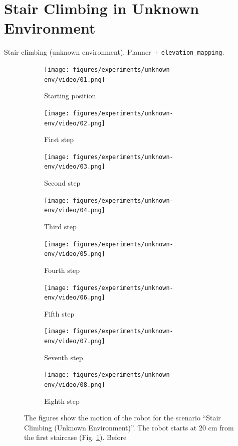 \section{Stair Climbing in Unknown Environment}
Stair climbing (unknown environment). Planner + \texttt{elevation\_mapping}.
\begin{figure}
  \begin{subfigure}{0.48\textwidth}
    \texttt{[image: figures/experiments/unknown-env/video/01.png]}
    \caption{Starting position}
    \label{fig:exp:unkenv:frame1}
  \end{subfigure}\hspace*{\fill}
  \begin{subfigure}{0.48\textwidth}
    \texttt{[image: figures/experiments/unknown-env/video/02.png]}
    \caption{First step}
    \label{fig:exp:unkenv:frame2}
  \end{subfigure}
  \begin{subfigure}{0.48\textwidth}
    \texttt{[image: figures/experiments/unknown-env/video/03.png]}
    \caption{Second step}
  \end{subfigure}\hspace*{\fill}
  \begin{subfigure}{0.48\textwidth}
    \texttt{[image: figures/experiments/unknown-env/video/04.png]}
    \caption{Third step}
  \end{subfigure}
  \begin{subfigure}{0.48\textwidth}
    \texttt{[image: figures/experiments/unknown-env/video/05.png]}
    \caption{Fourth step}
  \end{subfigure}\hspace*{\fill}
  \begin{subfigure}{0.48\textwidth}
    \texttt{[image: figures/experiments/unknown-env/video/06.png]}
    \caption{Fifth step}
  \end{subfigure}
  \begin{subfigure}{0.48\textwidth}
    \texttt{[image: figures/experiments/unknown-env/video/07.png]}
    \caption{Seventh step}
  \end{subfigure}\hspace*{\fill}
  \begin{subfigure}{0.48\textwidth}
    \texttt{[image: figures/experiments/unknown-env/video/08.png]}
    \caption{Eighth step}
  \end{subfigure} \caption{The figures show the motion of the robot
      for the scenario ``Stair Climbing (Unknown Environment)''.
      The robot starts at 20 cm 
      from the first staircase (Fig. \ref{fig:exp:unkenv:frame1}). Before 
}
\end{figure}
